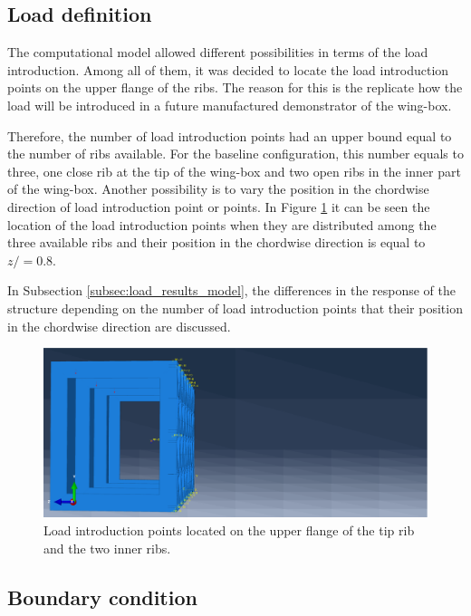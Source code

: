   \clearpage
  \subsection{Load definition} \label{subsec:load_computationalModel}

    The computational model allowed different possibilities in terms of the load introduction. Among all of them, it was decided to locate the load introduction points on the upper flange of the ribs. The reason for this is the replicate how the load will be introduced in a future manufactured demonstrator of the wing-box.

    Therefore, the number of load introduction points had an upper bound equal to the number of ribs available. For the baseline configuration, this number equals to three, one close rib at the tip of the wing-box and two open ribs in the inner part of the wing-box. Another possibility is to vary the position in the chordwise direction of load introduction point or points. In Figure \ref{fig:loadIntroductionPoints} it can be seen the location of the load introduction points when they are distributed among the three available ribs and their position in the chordwise direction is equal to $z / = 0.8 $.

    In Subsection \ref{subsec:load_results_model}, the differences in the response of the structure depending on the number of load introduction points that their position in the chordwise direction are discussed.

    \begin{figure}[!htpb]
      \centering
      \includegraphics[width=0.6 \textwidth]{figures/model/loadIntroductionPoints}
      \caption[Load introduction points located on the upper flange of the tip rib and the two inner ribs]{Load introduction points located on the upper flange of the tip rib and the two inner ribs.}
      \label{fig:loadIntroductionPoints}
    \end{figure}

  \subsection{Boundary condition} \label{subsec:boundary_computationalModel}

